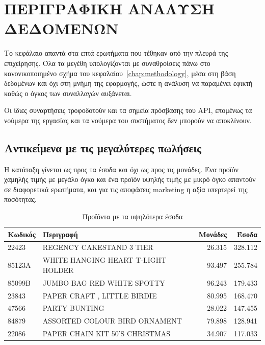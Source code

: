 \chapter{ΠΕΡΙΓΡΑΦΙΚΗ ΑΝΑΛΥΣΗ ΔΕΔΟΜΕΝΩΝ}
\label{chap:descriptive}

Το κεφάλαιο απαντά στα επτά ερωτήματα που τέθηκαν από την πλευρά της
επιχείρησης. Όλα τα μεγέθη υπολογίζονται με συναθροίσεις πάνω στο
κανονικοποιημένο σχήμα του κεφαλαίου~\ref{chap:methodology}, μέσα στη βάση
δεδομένων και όχι στη μνήμη της εφαρμογής, ώστε η ανάλυση να παραμένει εφικτή
καθώς ο όγκος των συναλλαγών αυξάνεται.

Οι ίδιες συναρτήσεις τροφοδοτούν και τα σημεία πρόσβασης του API, επομένως τα
νούμερα της εργασίας και τα νούμερα του συστήματος δεν μπορούν να αποκλίνουν.

\section{Αντικείμενα με τις μεγαλύτερες πωλήσεις}

Η κατάταξη γίνεται ως προς τα έσοδα και όχι ως προς τις μονάδες. Ένα προϊόν
χαμηλής τιμής με μεγάλο όγκο και ένα προϊόν υψηλής τιμής με μικρό όγκο
απαντούν σε διαφορετικά ερωτήματα, και για τις αποφάσεις marketing η αξία
υπερτερεί της ποσότητας.

\begin{table}[H]
\centering
\caption{Προϊόντα με τα υψηλότερα έσοδα}
\label{tab:top-products}
\begin{tabular}{llrr}
\toprule
Κωδικός & Περιγραφή & Μονάδες & Έσοδα \\
\midrule
22423  & \textenglish{REGENCY CAKESTAND 3 TIER}           & 26.315 & 328.112 \\
85123A & \textenglish{WHITE HANGING HEART T-LIGHT HOLDER} & 93.497 & 255.784 \\
85099B & \textenglish{JUMBO BAG RED WHITE SPOTTY}         & 96.243 & 179.433 \\
23843  & \textenglish{PAPER CRAFT , LITTLE BIRDIE}        & 80.995 & 168.470 \\
47566  & \textenglish{PARTY BUNTING}                      & 28.022 & 147.455 \\
84879  & \textenglish{ASSORTED COLOUR BIRD ORNAMENT}      & 79.898 & 128.941 \\
22086  & \textenglish{PAPER CHAIN KIT 50'S CHRISTMAS}     & 34.907 & 117.033 \\
\bottomrule
\end{tabular}
\end{table}


